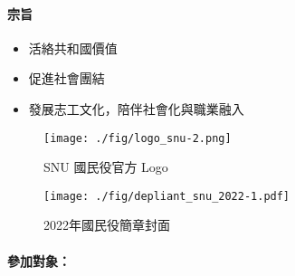 \documentclass[a4paper,14pt]{extarticle}
\theoremstyle{plain}
\theoremstyle{remark}
\numberwithin{equation}{section}
\begin{document}

\paragraph{宗旨}



\begin{itemize}
	\item 活絡共和國價值 %
	\item 促進社會團結 %
	\item  發展志工文化，陪伴社會化與職業融入 %
\end{itemize}


\begin{figure}[H]
	\centering
\texttt{[image: ./fig/logo\_snu-2.png]}
	\caption{SNU 國民役官方 Logo}
\end{figure}

\begin{figure}[H]
	\centering
	\texttt{[image: ./fig/depliant\_snu\_2022-1.pdf]}
	\caption{2022年國民役簡章封面}
\end{figure}



\paragraph{參加對象：}

\end{document}
